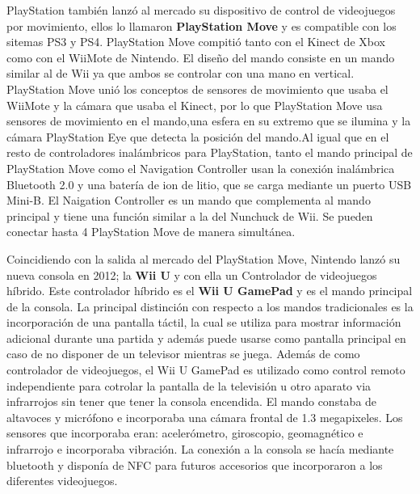 PlayStation tambi\'en lanz\'o al mercado su dispositivo de control de videojuegos por movimiento, ellos lo llamaron \textbf{PlayStation Move} y es compatible con los sitemas PS3 y PS4. PlayStation Move compiti\'o tanto con el Kinect de Xbox como con el WiiMote de Nintendo. El dise\~no del mando consiste en un mando similar al de Wii ya que ambos se controlar con una mano en vertical. PlayStation Move uni\'o los conceptos de sensores de movimiento que usaba el WiiMote y la c\'amara que usaba el Kinect, por lo que PlayStation Move usa sensores de movimiento en el mando,una esfera en su extremo que se ilumina y la c\'amara PlayStation Eye que detecta la posici\'on del mando.Al igual que en el resto de controladores inal\'ambricos para PlayStation, tanto el mando principal de PlayStation Move como el Navigation Controller usan la conexi\'on inal\'ambrica Bluetooth 2.0 y una bater\'ia de ion de litio, que se carga mediante un puerto USB Mini-B. El Naigation Controller es un mando que complementa al mando principal y tiene una funci\'on similar a la del Nunchuck de Wii. Se pueden conectar hasta 4 PlayStation Move de manera simult\'anea.\par
 
Coincidiendo con la salida al mercado del PlayStation Move, Nintendo lanz\'o su nueva consola en 2012; la \textbf{Wii U} y con ella un Controlador de videojuegos h\'ibrido. Este controlador h\'ibrido es el \textbf{Wii U GamePad} y es el mando principal de la consola. La principal distinci\'on con respecto a los mandos tradicionales es la incorporaci\'on de una pantalla t\'actil, la cual se utiliza para mostrar informaci\'on adicional durante una partida y adem\'as puede usarse como pantalla principal en caso de no disponer de un televisor mientras se juega. Adem\'as de como controlador de videojuegos, el Wii U GamePad es utilizado como control remoto independiente para cotrolar la pantalla de la televisi\'on u otro aparato via infrarrojos sin tener que tener la consola encendida. El mando constaba de altavoces y micr\'ofono e incorporaba una c\'amara frontal de 1.3 megapixeles. Los sensores que incorporaba eran: aceler\'ometro, giroscopio, geomagn\'etico e infrarrojo e incorporaba vibraci\'on. La conexi\'on a la consola se hac\'ia mediante bluetooth  y dispon\'ia de NFC para futuros accesorios que incorporaron a los diferentes videojuegos.\par

